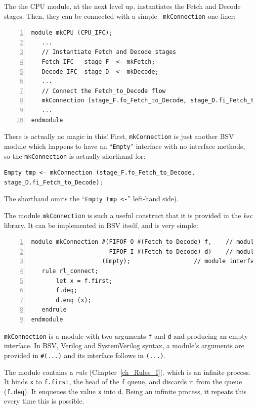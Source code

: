 The the CPU module, at the next level up, instantiates the Fetch and
Decode stages.  Then, they can be connected with a simple {\tt
mkConnection} one-liner:

{\small
\begin{Verbatim}[frame=single, numbers=left]
module mkCPU (CPU_IFC);
   ...
   // Instantiate Fetch and Decode stages
   Fetch_IFC   stage_F  <- mkFetch;
   Decode_IFC  stage_D  <- mkDecode;
   ...
   // Connect the Fetch_to_Decode flow
   mkConnection (stage_F.fo_Fetch_to_Decode, stage_D.fi_Fetch_to_Decode);
   ...
endmodule
\end{Verbatim}
}

There is actually no magic in this!  First, {\tt mkConnection} is just
another BSV module which happens to have an ``\verb|Empty|'' interface
with no interface methods, so the \verb|mkConnection| is actually
shorthand for:

{\small
\begin{Verbatim}[frame=single]
   Empty tmp <- mkConnection (stage_F.fo_Fetch_to_Decode, stage_D.fi_Fetch_to_Decode);
\end{Verbatim}
}

The shorthand omits the ``{\tt Empty~tmp~<-}'' left-hand side).

The module \verb|mkConnection| is such a useful construct that it is
provided in the \emph{bsc} library.  It can be implemented in BSV
itself, and is very simple:

{\small
\begin{Verbatim}[frame=single, numbers=left]
module mkConnection #(FIFOF_O #(Fetch_to_Decode) f,    // module argument
                      FIFOF_I #(Fetch_to_Decode) d)    // module argument
                    (Empty);                  // module interface
   rule rl_connect;
       let x = f.first;
       f.deq;
       d.enq (x);
   endrule
endmodule
\end{Verbatim}
}

{\tt mkConnection} is a module with two arguments {\tt f} and {\tt d}
and producing an empty interface.  In BSV, Verilog and SystemVerilog
syntax, a module's arguments are provided in {\tt \#(...)} and its
interface follows in {\tt (...)}.


The module contains a \emph{rule} (Chapter~\ref{ch_Rules_I}), which is
an infinite process.  It binds {\tt x} to {\tt f.first}, the head of
the {\tt f} queue, and discards it from the queue ({\tt f.deq}).  It
enqueues the value {\tt x} into {\tt d}.  Being an infinite process,
it repeats this every time this is possible.

